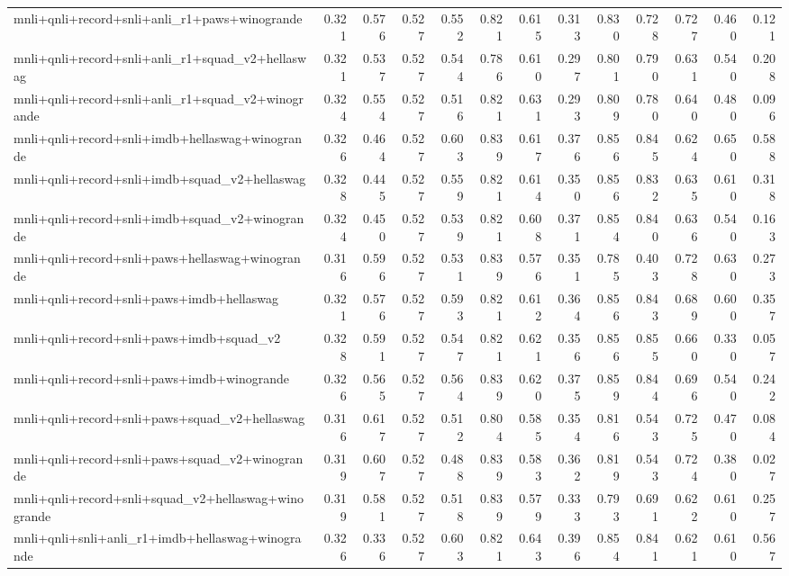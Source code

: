 \begin{table}[t]
\begin{tabular}{lrrrrrrrrrrrr}
    mnli+qnli+record+snli+anli\_r1+paws+winogrande & 0.321 & 0.576 & 0.527 & 0.552 & 0.821 & 0.615 & 0.313 & 0.830 & 0.728 & 0.727 & 0.460 & 0.121 \\
    mnli+qnli+record+snli+anli\_r1+squad\_v2+hellaswag & 0.321 & 0.537 & 0.527 & 0.544 & 0.786 & 0.610 & 0.297 & 0.801 & 0.790 & 0.631 & 0.540 & 0.208 \\
    mnli+qnli+record+snli+anli\_r1+squad\_v2+winogrande & 0.324 & 0.554 & 0.527 & 0.516 & 0.821 & 0.631 & 0.293 & 0.809 & 0.780 & 0.640 & 0.480 & 0.096 \\
    mnli+qnli+record+snli+imdb+hellaswag+winogrande & 0.326 & 0.464 & 0.527 & 0.603 & 0.839 & 0.617 & 0.376 & 0.856 & 0.845 & 0.624 & 0.650 & 0.588 \\
    mnli+qnli+record+snli+imdb+squad\_v2+hellaswag & 0.328 & 0.445 & 0.527 & 0.559 & 0.821 & 0.614 & 0.350 & 0.856 & 0.832 & 0.635 & 0.610 & 0.318 \\
    mnli+qnli+record+snli+imdb+squad\_v2+winogrande & 0.324 & 0.450 & 0.527 & 0.539 & 0.821 & 0.608 & 0.371 & 0.854 & 0.840 & 0.636 & 0.540 & 0.163 \\
    mnli+qnli+record+snli+paws+hellaswag+winogrande & 0.316 & 0.596 & 0.527 & 0.531 & 0.839 & 0.576 & 0.351 & 0.785 & 0.403 & 0.728 & 0.630 & 0.273 \\
    mnli+qnli+record+snli+paws+imdb+hellaswag & 0.321 & 0.576 & 0.527 & 0.593 & 0.821 & 0.612 & 0.364 & 0.856 & 0.843 & 0.689 & 0.600 & 0.357 \\
    mnli+qnli+record+snli+paws+imdb+squad\_v2 & 0.328 & 0.591 & 0.527 & 0.547 & 0.821 & 0.621 & 0.356 & 0.856 & 0.855 & 0.660 & 0.330 & 0.057 \\
    mnli+qnli+record+snli+paws+imdb+winogrande & 0.326 & 0.565 & 0.527 & 0.564 & 0.839 & 0.620 & 0.375 & 0.859 & 0.844 & 0.696 & 0.540 & 0.242 \\
    mnli+qnli+record+snli+paws+squad\_v2+hellaswag & 0.316 & 0.617 & 0.527 & 0.512 & 0.804 & 0.585 & 0.354 & 0.816 & 0.543 & 0.725 & 0.470 & 0.084 \\
    mnli+qnli+record+snli+paws+squad\_v2+winogrande & 0.319 & 0.607 & 0.527 & 0.488 & 0.839 & 0.583 & 0.362 & 0.819 & 0.543 & 0.724 & 0.380 & 0.027 \\
    mnli+qnli+record+snli+squad\_v2+hellaswag+winogrande & 0.319 & 0.581 & 0.527 & 0.518 & 0.839 & 0.579 & 0.333 & 0.793 & 0.691 & 0.622 & 0.610 & 0.257 \\
    mnli+qnli+snli+anli\_r1+imdb+hellaswag+winogrande & 0.326 & 0.336 & 0.527 & 0.603 & 0.821 & 0.643 & 0.396 & 0.854 & 0.841 & 0.621 & 0.610 & 0.567 \\

\end{tabular}
\end{table}
